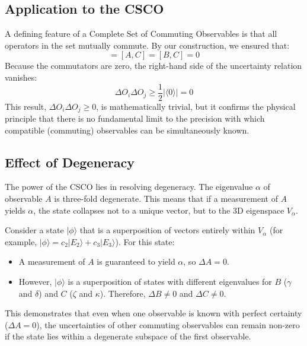 \documentclass[11pt,a4paper]{article}
\begin{document}
  \subsection{Application to the CSCO}
  A defining feature of a Complete Set of Commuting Observables is that all
  operators in the set mutually commute. By our construction, we ensured that:
  \begin{equation*}
    [A, B] = [A, C] = [B, C] = 0
  \end{equation*}
  Because the commutators are zero, the right-hand side of the uncertainty
  relation vanishes:
  \begin{equation*}
    \Delta O_i \Delta O_j \ge \frac{1}{2} \left| \langle 0 \rangle \right| = 0
  \end{equation*}
  This result, $\Delta O_i \Delta O_j \ge 0$, is mathematically trivial, but it
  confirms the physical principle that there is no fundamental limit to
  the precision with which compatible (commuting) observables can be
  simultaneously known.

  \subsection{Effect of Degeneracy}
  The power of the CSCO lies in resolving degeneracy. The eigenvalue $\alpha$ of
  observable $A$ is three-fold degenerate. This means that if a measurement of
  $A$ yields $\alpha$, the state collapses not to a unique vector, but to the 3D
  eigenspace $V_{\alpha}$.

  Consider a state $|\phi\rangle$ that is a superposition of vectors entirely
  within $V_{\alpha}$ (for example, $|\phi\rangle = c_2|E_2\rangle +
  c_3|E_3\rangle$). For this state:
  \begin{itemize}
    \item A measurement of $A$ is guaranteed to yield $\alpha$, so
      $\Delta A = 0$.
    \item However, $|\phi\rangle$ is a superposition of states with different
      eigenvalues for $B$ ($\gamma$ and $\delta$) and $C$ ($\zeta$ and
      $\kappa$). Therefore, $\Delta B \neq 0$ and
      $\Delta C \neq 0$.
  \end{itemize}
  This demonstrates that even when one observable is known with perfect
  certainty ($\Delta A = 0$), the uncertainties of other commuting observables
  can remain non-zero if the state lies within a degenerate subspace of the
  first observable.
\end{document}
